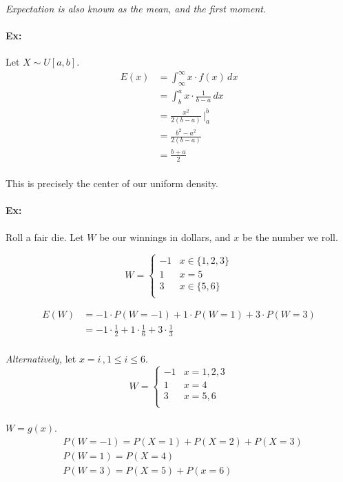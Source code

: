 \documentclass[letterpaper,12pt]{article}
\begin{document}
\paragraph{}\emph{Expectation is also known as the mean, and the first moment.}
\paragraph{Ex:} Let $X \sim U[a,b]$.
\begin{align*}
    E(x) &= \int_{\infty}^{\infty} x\cdot f(x)\,dx\\
         &= \int_b^a x\cdot \frac{1}{b-a}\,dx\\
         &= \frac{x^2}{2(b-a)} \,\bigg|_a^b\\
         &= \frac{b^2-a^2}{2(b-a)}\\
         &= \frac{b+a}{2}
\end{align*}
\paragraph{}This is precisely the center of our uniform density.
\paragraph{Ex:} Roll a fair die. Let $W$ be our winnings in dollars, and $x$ be the number we roll.

\[ W = \begin{cases}
    -1 & x \in \{1,2,3\} \\
    1 & x = 5 \\
    3 & x \in \{5,6\} \\
    \end{cases}
\]

\begin{align*}
    E(W) &= -1\cdot P(W = -1) + 1 \cdot P(W = 1) + 3 \cdot P(W = 3)\\
         &= -1 \cdot \frac{1}{2} + 1\cdot \frac{1}{6} + 3 \cdot \frac{1}{3}\\
\end{align*}

\emph{Alternatively,} let $x = i\,, 1 \le i \le 6$.
\[ W = \begin{cases}
    -1 & x = 1,2,3 \\
    1 & x = 4 \\
    3 & x = 5,6 \\
    \end{cases}
\]
\paragraph{}$W = g(x)$.
\begin{align*}
    &P(W=-1) = P(X=1) + P(X=2) + P(X=3)\\
    &P(W=1) = P(X=4)\\
    &P(W=3) = P(X=5) + P(x=6)
\end{align*}
\end{document}
